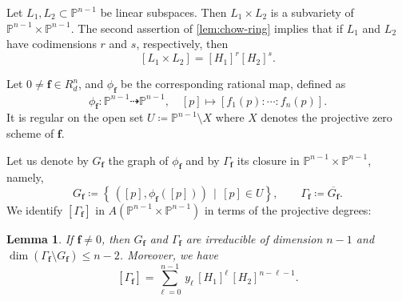 \documentclass[11pt,letterpaper]{article}
\newtheorem{lemma}[theorem]{Lemma}\AddToHook{env/lemma/begin}{\crefalias{theorem}{lemma}}
\numberwithin{equation}{section}
\newcommand{\PP}{\mathbb{P}}
\newcommand{\ff}{\ensuremath{\boldsymbol{f}}}
\begin{document}
Let $L_1,L_2\subset\PP^{n-1}$ be linear subspaces.
Then $L_1\times L_2$ is a subvariety of $\PP^{n-1}\times\PP^{n-1}$.
The second assertion of \cref{lem:chow-ring} implies that if $L_1$ and $L_2$ have codimensions $r$ and $s$, respectively, then \[
[L_1\times L_2] = [H_1]^{r} [H_2]^s.
\]

Let $0\neq\ff\in R_d^n$, and $\phi_{\ff}$ be the corresponding rational map, defined as \[
\phi_{\ff} : \PP^{n-1}\dashrightarrow \PP^{n-1},\quad [p]\mapsto [ f_1(p):\cdots : f_n(p)].
\]
It is regular on the open set $U\coloneqq \PP^{n-1}\setminus X$ where $X$ denotes the projective zero scheme of $\ff$.

Let us denote by $G_{\ff}$ the graph of $\phi_{\ff}$ and
by $\Gamma_{\ff}$ its closure in $\PP^{n-1}\times\PP^{n-1}$, namely, \[
G_{\ff}\coloneqq \left\{\,\left([p],\phi_{\ff}([p])\right)\, \mid \, [p]\in U\right\},\qquad
\Gamma_{\ff} \coloneqq \overline{G_{\ff}}.
\]
We identify $[\Gamma_{\ff}]$ in $A(\PP^{n-1}\times\PP^{n-1})$ in terms of the projective degrees:
\begin{lemma}
\label{lem:projective-degrees}
If $\ff\neq 0$, then
 $G_{\ff}$ and $\Gamma_{\ff}$ are irreducible of dimension $n-1$ and $\dim (\Gamma_{\ff}\setminus G_{\ff})\leq n-2$.
    Moreover, we have \begin{equation}
   \label{eq:class-formula}
    [\Gamma_{\ff}] = \sum_{\ell=0}^{n-1} \, y_\ell \, [H_1]^{\ell} \, [H_2]^{n-\ell-1}.
        \end{equation}
\end{lemma}
\end{document}
